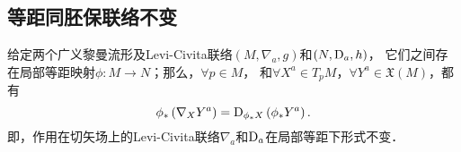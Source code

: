 \subsection{等距同胚保联络不变}\label{chrg:sec_isometry-connection}
\begin{theorem}\label{chrg:thm_isometry-connection-vector}
    给定两个广义黎曼流形及Levi-Civita联络$(M,\nabla_a,g)$和$(N,{\rm D}_a,h)$，
    它们之间存在局部等距映射$\phi:M\to N$；那么，$\forall p\in M$，
    和$\forall X^a \in T_{p}M$，$ \forall Y^a \in \mathfrak{X}(M)$，都有
    \begin{equation}\label{chrg:eqn_isometry-connection-vec}
    \phi_{*} \left(\nabla _X Y^a \right) = {\rm D}_ {\phi_* X} \left({\phi_*}Y^a \right) .
    \end{equation}
    即，作用在切矢场上的Levi-Civita联络$\nabla_a$和${\rm D}_a$在局部等距下形式不变．
\end{theorem}
